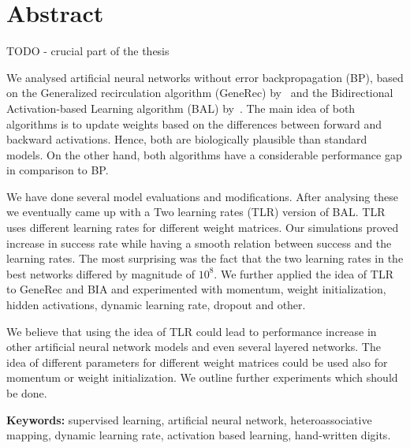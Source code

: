 
\section*{Abstract}
TODO - crucial part of the thesis 

We analysed artificial neural networks without error backpropagation (BP), based on the Generalized recirculation algorithm (GeneRec) by~\citet{o1996bio} and the Bidirectional Activation-based Learning algorithm (BAL) by~\citet{farkas2013bal}. The main idea of both algorithms is to update weights based on the differences between forward and backward activations. Hence, both are biologically plausible than standard models. On the other hand, both algorithms have a considerable performance gap in comparison to BP.

We have done several model evaluations and modifications. After analysing these we eventually came up with a Two learning rates (TLR) version of BAL. TLR uses different learning rates for different weight matrices. Our simulations proved increase in success rate while having a smooth relation between success and the learning rates. The most surprising was the fact that the two learning rates in the best networks differed by magnitude of $10^8$. We further applied the idea of TLR to GeneRec and BIA and experimented with momentum, weight initialization, hidden activations, dynamic learning rate, dropout and other. 

We believe that using the idea of TLR could lead to performance increase in other artificial neural network models and even several layered networks. The idea of different parameters for different weight matrices could be used also for momentum or weight initialization. We outline further experiments which should be done. 

\begin{flushleft}
  \textbf{Keywords:} supervised learning, artificial neural network, heteroassociative mapping, dynamic learning rate, activation based learning, hand-written digits. 
\end{flushleft}


